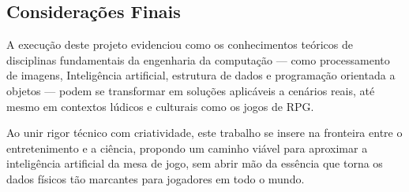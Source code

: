\subsection*{Considerações Finais}

A execução deste projeto evidenciou como os conhecimentos teóricos de disciplinas fundamentais da engenharia da computação — como 
processamento de imagens, Inteligência artificial, estrutura de dados e programação orientada a objetos — podem se transformar em soluções 
aplicáveis a cenários reais, até mesmo em contextos lúdicos e culturais como os jogos de RPG.

Ao unir rigor técnico com criatividade, este trabalho se insere na fronteira entre o entretenimento e a ciência, propondo um caminho 
viável para aproximar a inteligência artificial da mesa de jogo, sem abrir mão da essência que torna os dados físicos tão marcantes para 
jogadores em todo o mundo.

